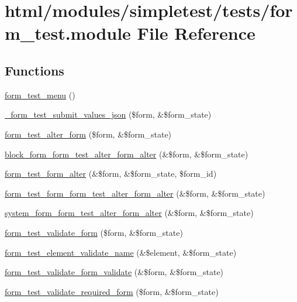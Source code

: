 \hypertarget{form__test_8module}{
\section{html/modules/simpletest/tests/form\_\-test.module File Reference}
\label{form__test_8module}
}
\subsection*{Functions}
\begin{DoxyCompactItemize}
\item 
\hyperlink{form__test_8module_a575bece07d2aeb8c80ce539ab60f5917}{form\_\-test\_\-menu} ()
\item 
\hyperlink{form__test_8module_a3e98d202f2701cac2cf93649f81d6330}{\_\-form\_\-test\_\-submit\_\-values\_\-json} (\$form, \&\$form\_\-state)
\item 
\hyperlink{form__test_8module_a8f29d88f476cd4a4d7770cb83f5b9e5e}{form\_\-test\_\-alter\_\-form} (\$form, \&\$form\_\-state)
\item 
\hyperlink{form__test_8module_ae941263147dfe0890c35bd5136c58da5}{block\_\-form\_\-form\_\-test\_\-alter\_\-form\_\-alter} (\&\$form, \&\$form\_\-state)
\item 
\hyperlink{form__test_8module_afc7a8dae00439af9b34292e9688702fa}{form\_\-test\_\-form\_\-alter} (\&\$form, \&\$form\_\-state, \$form\_\-id)
\item 
\hyperlink{form__test_8module_ad94a51a83fd9967f9388f7e7a6f03d99}{form\_\-test\_\-form\_\-form\_\-test\_\-alter\_\-form\_\-alter} (\&\$form, \&\$form\_\-state)
\item 
\hyperlink{form__test_8module_a17e5292c04567982f20e046b897643a9}{system\_\-form\_\-form\_\-test\_\-alter\_\-form\_\-alter} (\&\$form, \&\$form\_\-state)
\item 
\hyperlink{form__test_8module_a0407b03ec9fd246fee1c31844bb5ffbc}{form\_\-test\_\-validate\_\-form} (\$form, \&\$form\_\-state)
\item 
\hyperlink{form__test_8module_a4db639893c06b223ab87875dccb0ff80}{form\_\-test\_\-element\_\-validate\_\-name} (\&\$element, \&\$form\_\-state)
\item 
\hyperlink{form__test_8module_a187c76e4b9893f38a549a9a8b8564655}{form\_\-test\_\-validate\_\-form\_\-validate} (\&\$form, \&\$form\_\-state)
\item 
\hyperlink{form__test_8module_a19d7e573a59984582ba545d6a796fe2b}{form\_\-test\_\-validate\_\-required\_\-form} (\$form, \&\$form\_\-state)

\end{DoxyCompactItemize}
